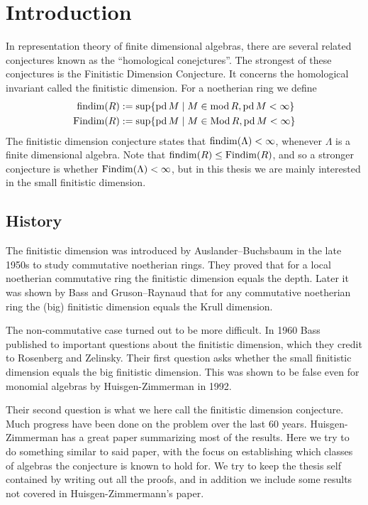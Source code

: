 \section*{Introduction}
%

In representation theory of finite dimensional algebras, there are several related conjectures known as the ``homological conejctures''. The strongest of these conjectures is the Finitistic Dimension Conjecture. It concerns the homological invariant called the finitistic dimension. For a noetherian ring we define
\begin{align*}
  \operatorname{findim}(R) &:= \sup\{\operatorname{pd} M \mid M \in \operatorname{mod} R, \operatorname{pd} M < \infty\}\\
  \operatorname{Findim}(R) &:= \sup\{\operatorname{pd} M \mid M \in \operatorname{Mod} R, \operatorname{pd} M < \infty\}
\end{align*}
The finitistic dimension conjecture states that $\operatorname{findim}(\Lambda) < \infty$, whenever $\Lambda$ is a finite dimensional algebra. Note that $\operatorname{findim}(R) \leq \operatorname{Findim}(R)$, and so a stronger conjecture is whether $\operatorname{Findim}(\Lambda) < \infty$, but in this thesis we are mainly interested in the small finitistic dimension.

\subsection*{History}

The finitistic dimension was introduced by Auslander--Buchsbaum in the late 1950s to study commutative noetherian rings. They proved that for a local noetherian commutative ring the finitistic dimension equals the depth\cite{AB57}. Later it was shown by Bass and Gruson--Raynaud that for any commutative noetherian ring the (big) finitistic dimension equals the Krull dimension\cite{Bass62,RG71}.

The non-commutative case turned out to be more difficult. In 1960 Bass published to important questions about the finitistic dimension\cite{Bass60}, which they credit to Rosenberg and Zelinsky. Their first question asks whether the small finitistic dimension equals the big finitistic dimension. This was shown to be false even for monomial algebras by Huisgen-Zimmerman in 1992\cite{ZH92}.

Their second question is what we here call the finitistic dimension conjecture. Much progress have been done on the problem over the last 60 years. Huisgen-Zimmerman has a great paper summarizing most of the results\cite{ZH95}. Here we try to do something similar to said paper, with the focus on establishing which classes of algebras the conjecture is known to hold for. We try to keep the thesis self contained by writing out all the proofs, and in addition we include some results not covered in Huisgen-Zimmermann's paper.

